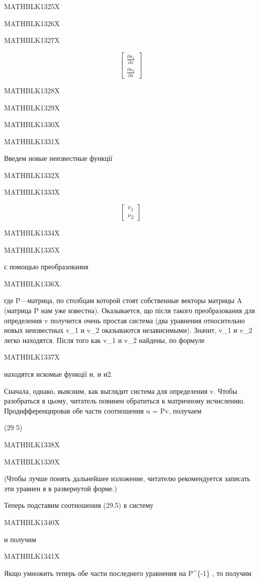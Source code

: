 \documentclass[
  ukrainian,
]{article}
\begin{document}
MATHBLK1325X

MATHBLK1326X

MATHBLK1327X

\[
\begin{bmatrix} \frac{\partial u_1}{\partial x} \\ \frac{\partial u_2}{\partial x} \end{bmatrix}
\]

MATHBLK1328X

MATHBLK1329X

MATHBLK1330X

MATHBLK1331X

Введем новые неизвестные функції

MATHBLK1332X

MATHBLK1333X

\[
\begin{bmatrix} v_1 \\ v_2 \end{bmatrix}
\]

MATHBLK1334X

MATHBLK1335X

с помощью преобразования

MATHBLK1336X.

где P---матрица, по столбцам которой стоят собственные векторы матрицы A
(матрица P нам уже известна). Оказывается, що після такого
преобразования для определения v получится очень простая система (два
уравнения относительно новых неизвестных v\_1 и v\_2 оказываются
независимыми). Значит, v\_1 и v\_2 легко находятся. Після того как v\_1
и v\_2 найдены, по формуле

MATHBLK1337X

находятся искомые функції и, и и2.

Сначала, однако, выясним, как выглядит система для определения v. Чтобы
разобраться в цьому, читатель повинен обратиться к матричному
исчислению. Продифференцировав обе части соотношения u = Pv, получаем

(29 5)

MATHBLK1338X

MATHBLK1339X

(Чтобы лучше понять дальнейшее изложение, читателю рекомендуется
записать эти уравнен я в развернутой форме.)

Теперь подставим соотношения (29.5) в систему

MATHBLK1340X

и получим

MATHBLK1341X

Якщо умножить теперь обе части последнего уравнения на P\^{}\{-1\} , то
получим
\end{document}
